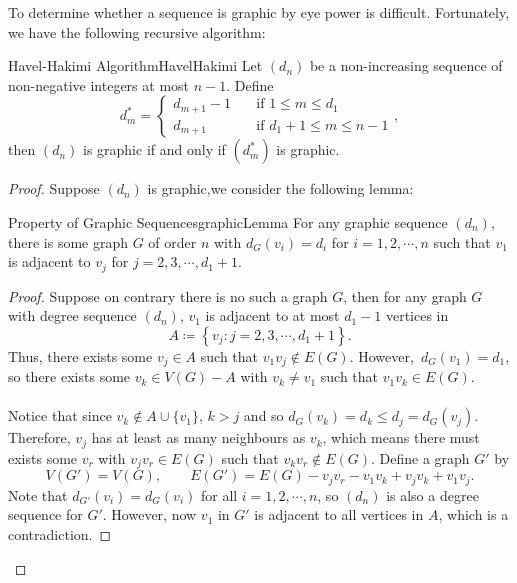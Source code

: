 \documentclass[math]{amznotes}
\theoremstyle{remark}
\newcommand{\0}{\mathbf{0}}
\newcommand{\1}{\mathbf{1}}
\begin{document}
To determine whether a sequence is graphic by eye power is difficult. Fortunately, we have the following recursive algorithm:
\begin{thmbox}{Havel-Hakimi Algorithm}{HavelHakimi}
    Let $(d_n)$ be a non-increasing sequence of non-negative integers at most $n - 1$. Define
    \begin{equation*}
        d^*_m = \begin{cases}
            d_{m + 1} - 1 & \quad\textrm{if } 1 \leq m \leq d_1 \\
            d_{m + 1} & \quad\textrm{if } d_1 + 1 \leq m \leq n - 1
        \end{cases},
    \end{equation*}
    then $(d_n)$ is graphic if and only if $\left(d^*_m\right)$ is graphic.
    \tcblower
    \begin{proof}
        Suppose $(d_n)$ is graphic,we consider the following lemma:
        \begin{lembox}{Property of Graphic Sequences}{graphicLemma}
            For any graphic sequence $(d_n)$, there is some graph $G$ of order $n$ with $d_G(v_i) = d_i$ for $i = 1, 2, \cdots, n$ such that $v_1$ is adjacent to $v_j$ for $j = 2, 3, \cdots, d_1 + 1$.
            \tcblower
            \begin{proof}
                Suppose on contrary there is no such a graph $G$, then for any graph $G$ with degree sequence $(d_n)$, $v_1$ is adjacent to at most $d_1 - 1$ vertices in
                \begin{equation*}
                    A \coloneqq \left\{v_j \colon j = 2, 3, \cdots, d_1 + 1\right\}.
                \end{equation*}
                Thus, there exists some $v_j \in A$ such that $v_1v_j \notin E(G)$. However,~$d_G(v_1) = d_1$, so there exists some $v_k \in V(G) - A$ with $v_k \neq v_1$ such that $v_1v_k \in E(G)$.
                \\\\
                Notice that since $v_k \notin A \cup \{v_1\}$, $k > j$ and so $d_G(v_k) = d_k \leq d_j = d_G(v_j)$. Therefore, $v_j$ has at least as many neighbours as $v_k$, which means there must exists some $v_r$ with $v_jv_r \in E(G)$ such that $v_kv_r \notin E(G)$. Define a graph $G'$ by
                \begin{equation*}
                    V(G') = V(G), \qquad E(G') = E(G) - v_jv_r - v_1v_k + v_jv_k + v_1v_j.
                \end{equation*}
                Note that $d_{G'}(v_i) = d_G(v_i)$ for all $i = 1, 2, \cdots, n$, so $(d_n)$ is also a degree sequence for $G'$. However, now $v_1$ in $G'$ is adjacent to all vertices in $A$, which is a contradiction.

\end{proof}
\end{lembox}
\end{proof}
\end{thmbox}
\end{document}
